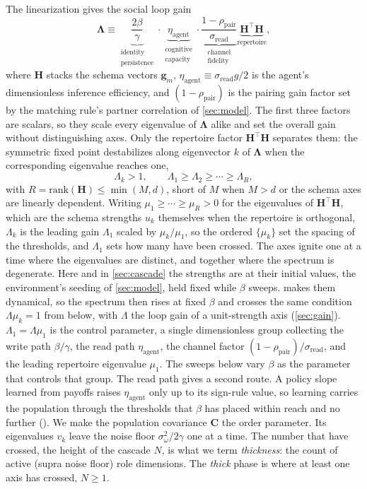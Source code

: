 \documentclass[
  aps,prx,
  reprint,
  superscriptaddress,
  nofootinbib,
  longbibliography
]{revtex4-2}
\newcommand{\g}{\mathbf{g}}
\newcommand{\C}{\mathbf{C}}
\newcommand{\Lam}{\bm{\Lambda}}
\newcommand{\etaag}{\eta_{\mathrm{agent}}}
\newcommand{\rhopair}{\rho_{\mathrm{pair}}}
\newcommand{\sread}{\sigma_{\mathrm{read}}}
\newcommand{\sidn}{\sigma_{\omega}}
\newcommand{\gain}{g}
\newcommand{\smref}[1]{\cite[Sec.~#1]{SM}}
\begin{document}
The linearization gives the social loop gain
\begin{equation}
\Lam \equiv \underbrace{\frac{2\beta}{\gamma}}_{\substack{\text{identity}\\\text{persistence}}}\cdot
\underbrace{\etaag}_{\substack{\text{cognitive}\\\text{capacity}}}\cdot
\underbrace{\frac{1-\rhopair}{\sread}}_{\substack{\text{channel}\\\text{fidelity}}}
\underbrace{\bm{H}^{\!\top}\!\bm{H}}_{\text{repertoire}} ,
\label{eq:lambda}
\end{equation}
where $\bm{H}$ stacks the schema vectors $\g_m$, $\etaag\equiv\sread\gain/2$ is the agent's dimensionless inference efficiency, and $(1-\rhopair)$ is the pairing gain factor set by the matching rule's partner correlation of \cref{sec:model}. The first three factors are scalars, so they scale every eigenvalue of $\Lam$ alike and set the overall gain without distinguishing axes. Only the repertoire factor $\bm{H}^{\!\top}\bm{H}$ separates them: the symmetric fixed point destabilizes along eigenvector $k$ of $\Lam$ when the corresponding eigenvalue reaches one,
\begin{equation}
\Lambda_k > 1 ,\qquad \Lambda_1\ge\Lambda_2\ge\cdots\ge\Lambda_R ,
\label{eq:cascade}
\end{equation}
with $R=\mathrm{rank}(\bm{H})\le\min(M,d)$, short of $M$ when $M>d$ or the schema axes are linearly dependent. Writing $\mu_1\ge\cdots\ge\mu_R>0$ for the eigenvalues of $\bm{H}^{\!\top}\bm{H}$, which are the schema strengths $u_k$ themselves when the repertoire is orthogonal, $\Lambda_k$ is the leading gain $\Lambda_1$ scaled by $\mu_k/\mu_1$, so the ordered $\{\mu_k\}$ set the spacing of the thresholds, and $\Lambda_1$ sets how many have been crossed. The axes ignite one at a time where the eigenvalues are distinct, and together where the spectrum is degenerate. Here and in \cref{sec:cascade} the strengths are at their initial values, the environment's seeding of \cref{sec:model}, held fixed while $\beta$ sweeps.  makes them dynamical, so the spectrum then rises at fixed $\beta$ and crosses the same condition $\Lambda\mu_k=1$ from below, with $\Lambda$ the loop gain of a unit-strength axis (\cref{sec:gain}). $\Lambda_1=\Lambda\mu_1$ is the control parameter, a single dimensionless group collecting the write path $\beta/\gamma$, the read path $\etaag$, the channel factor $(1-\rhopair)/\sread$, and the leading repertoire eigenvalue $\mu_1$. The sweeps below vary $\beta$ as the parameter that controls that group. The read path gives a second route. A policy slope learned from payoffs raises $\etaag$ only up to its sign-rule value, so learning carries the population through the thresholds that $\beta$ has placed within reach and no further (\smref{S1\,D}). We make the population covariance $\C$ the order parameter.
Its eigenvalues $v_k$ leave the noise floor $\sidn^2/2\gamma$ one at a time. The number that have crossed, the height of the cascade $N$, is what we term \textit{thickness}: the count of active (supra noise floor) role dimensions. The \emph{thick} phase is where at least one axis has crossed, $N\ge1$.
\end{document}
